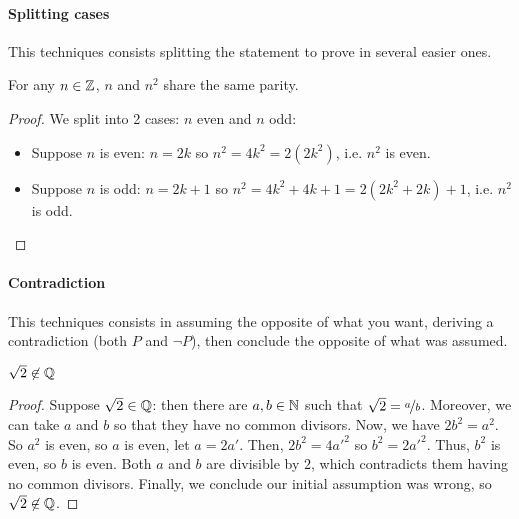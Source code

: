\paragraph{Splitting cases}
This techniques consists splitting the statement to prove in several easier ones.
\begin{property}
    For any $n \in \mathbb{Z}$, $n$ and $n^2$ share the same parity.
\end{property}
\begin{proof} We split into 2 cases: $n$ even and $n$ odd:
    \begin{itemize}
        \item Suppose $n$ is even: $n=2k$ so $n^2=4k^2=2(2k^2)$, i.e. $n^2$ is even.
        \item Suppose $n$ is odd: $n=2k+1$ so $n^2=4k^2+4k+1=2(2k^2+2k)+1$, i.e. $n^2$ is odd.
    \end{itemize}
\end{proof}
\paragraph{Contradiction}
This techniques consists in assuming the opposite of what you want, deriving a contradiction (both $P$ and $\lnot P$), then conclude the opposite of what was assumed.
\begin{property}
    $\sqrt{2} \not\in \mathbb{Q}$
\end{property}
\begin{proof}
    Suppose $\sqrt{2} \in \mathbb{Q}$: then there are $a,b \in \mathbb{N}$ such that $\sqrt{2} = \nicefrac{a}{b}$.
    Moreover, we can take $a$ and $b$ so that they have no common divisors.
    Now, we have $2b^2 = a^2$. So $a^2$ is even, so $a$ is even, let $a = 2a'$.
    Then, $2b^2 = 4a'^2$ so $b^2 = 2a'^2$. Thus, $b^2$ is even, so $b$ is even.
    Both $a$ and $b$ are divisible by $2$, which contradicts them having no common divisors.
    Finally, we conclude our initial assumption was wrong, so $\sqrt{2} \not\in \mathbb{Q}$.
\end{proof}
